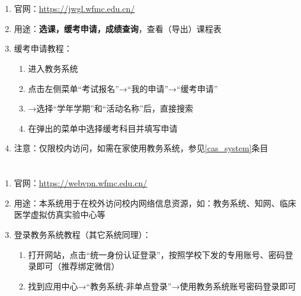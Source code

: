 \section[教务系统]{\textbf{}}
\begin{enumerate}
    \item 官网：\uline{\href{https://jwgl.wfmc.edu.cn/}{https://jwgl.wfmc.edu.cn/}}
    \item 用途：\textbf{选课，缓考申请，成绩查询}，查看（导出）课程表
    \item 缓考申请教程：
          \begin{enumerate}
              \item 进入教务系统
              \item 点击左侧菜单“考试报名”→“我的申请”→“缓考申请”
              \item →选择“学年学期”和“活动名称”后，直接搜索
              \item 在弹出的菜单中选择缓考科目并填写申请\footnotemark
          \end{enumerate}
    \item 注意：仅限校内访问，如需在家使用教务系统，参见\uline{\ref{cas_system}}条目
\end{enumerate}

\section[资源访问控制系统]{\textbf{}\footnotemark}
\label{cas_system}
\begin{enumerate}
    \item 官网：\uline{\href{https://webvpn.wfmc.edu.cn/}{https://webvpn.wfmc.edu.cn/}}
    \item 用途：本系统用于在校外访问校内网络信息资源，如：教务系统、知网、临床医学虚拟仿真实验中心\footnotemark 等
    \item 登录教务系统教程（其它系统同理）：
          \begin{enumerate}
              \item 打开网站，点击“统一身份认证登录”，按照学校下发的专用账号、密码登录即可（推荐绑定微信）
              \item 找到应用中心→“教务系统-非单点登录”\footnotemark →使用教务系统账号密码登录即可
          \end{enumerate}
\end{enumerate}

